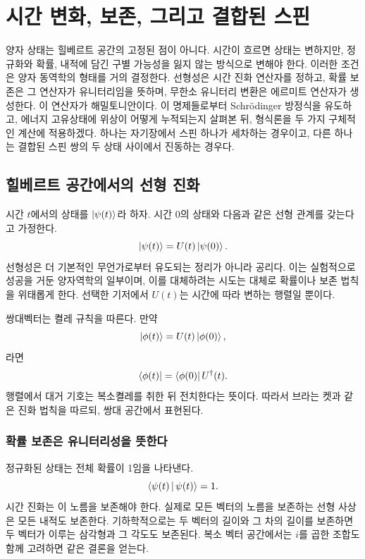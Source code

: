 \chapter{시간 변화, 보존, 그리고 결합된 스핀}

양자 상태는 힐베르트 공간의 고정된 점이 아니다. 시간이 흐르면 상태는 변하지만, 정규화와 확률, 내적에 담긴 구별 가능성을 잃지 않는 방식으로 변해야 한다. 이러한 조건은 양자 동역학의 형태를 거의 결정한다. 선형성은 시간 진화 연산자를 정하고, 확률 보존은 그 연산자가 유니터리임을 뜻하며, 무한소 유니터리 변환은 에르미트 연산자가 생성한다. 이 연산자가 해밀토니안이다. 이 명제들로부터 Schr\"odinger 방정식을 유도하고, 에너지 고유상태에 위상이 어떻게 누적되는지 살펴본 뒤, 형식론을 두 가지 구체적인 계산에 적용하겠다. 하나는 자기장에서 스핀 하나가 세차하는 경우이고, 다른 하나는 결합된 스핀 쌍의 두 상태 사이에서 진동하는 경우다.

\section{힐베르트 공간에서의 선형 진화}

시간 \(t\)에서의 상태를 \(\left\lvert\psi(t)\right\rangle\)라 하자. 시간 0의 상태와 다음과 같은 선형 관계를 갖는다고 가정한다.
\begin{equation}
\left\lvert\psi(t)\right\rangle=U(t)\left\lvert\psi(0)\right\rangle.
\end{equation}
선형성은 더 기본적인 무언가로부터 유도되는 정리가 아니라 공리다. 이는 실험적으로 성공을 거둔 양자역학의 일부이며, 이를 대체하려는 시도는 대체로 확률이나 보존 법칙을 위태롭게 한다. 선택한 기저에서 \(U(t)\)는 시간에 따라 변하는 행렬일 뿐이다.

쌍대벡터는 켤레 규칙을 따른다. 만약
\begin{equation}
\left\lvert\phi(t)\right\rangle=U(t)\left\lvert\phi(0)\right\rangle,
\end{equation}
라면
\begin{equation}
\left\langle\phi(t)\right\rvert=\left\langle\phi(0)\right\rvert U^\dagger(t).
\end{equation}
행렬에서 대거 기호는 복소켤레를 취한 뒤 전치한다는 뜻이다. 따라서 브라는 켓과 같은 진화 법칙을 따르되, 쌍대 공간에서 표현된다.

\subsection{확률 보존은 유니터리성을 뜻한다}

정규화된 상태는 전체 확률이 1임을 나타낸다.
\begin{equation}
\left\langle\psi(t)\,\middle|\,\psi(t)\right\rangle=1.
\end{equation}
시간 진화는 이 노름을 보존해야 한다. 실제로 모든 벡터의 노름을 보존하는 선형 사상은 모든 내적도 보존한다. 기하학적으로는 두 벡터의 길이와 그 차의 길이를 보존하면 두 벡터가 이루는 삼각형과 그 각도도 보존된다. 복소 벡터 공간에서는 \(i\)를 곱한 조합도 함께 고려하면 같은 결론을 얻는다.

